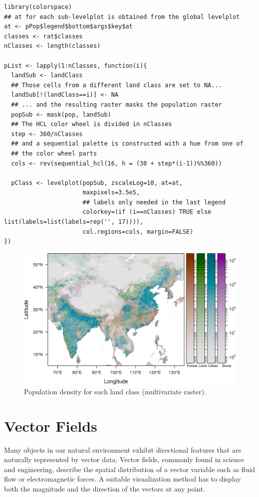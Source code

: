 \documentclass[smallroyalvopaper]{memoir}
\begin{document}
\lstset{language=R,numbers=none}
\begin{lstlisting}
library(colorspace)
## at for each sub-levelplot is obtained from the global levelplot
at <- pPop$legend$bottom$args$key$at
classes <- rat$classes
nClasses <- length(classes)

pList <- lapply(1:nClasses, function(i){
  landSub <- landClass
  ## Those cells from a different land class are set to NA...
  landSub[!(landClass==i)] <- NA
  ## ... and the resulting raster masks the population raster
  popSub <- mask(pop, landSub)
  ## The HCL color wheel is divided in nClasses
  step <- 360/nClasses
  ## and a sequential palette is constructed with a hue from one of
  ## the color wheel parts
  cols <- rev(sequential_hcl(16, h = (30 + step*(i-1))%%360))

  pClass <- levelplot(popSub, zscaleLog=10, at=at,
                      maxpixels=3.5e5,
                      ## labels only needed in the last legend
                      colorkey=(if (i==nClasses) TRUE else list(labels=list(labels=rep('', 17)))),
                      col.regions=cols, margin=FALSE)
})
\end{lstlisting}


\begin{figure}[htb]
\centering
\includegraphics[width=.9\linewidth]{figs/popLandClass.png}
\caption{\label{fig:popLandClass}Population density for each land class (multivariate raster).}
\end{figure}
\section{Vector Fields}
\label{sec-1}
\label{sec:vector}

Many objects in our natural environment exhibit directional
features that are naturally represented by vector data. Vector
fields, commonly found in science and engineering, describe the
spatial distribution of a vector variable such as fluid flow or
electromagnetic forces. A suitable visualization method has to
display both the magnitude and the direction of the vectors at any
point.
\end{document}
